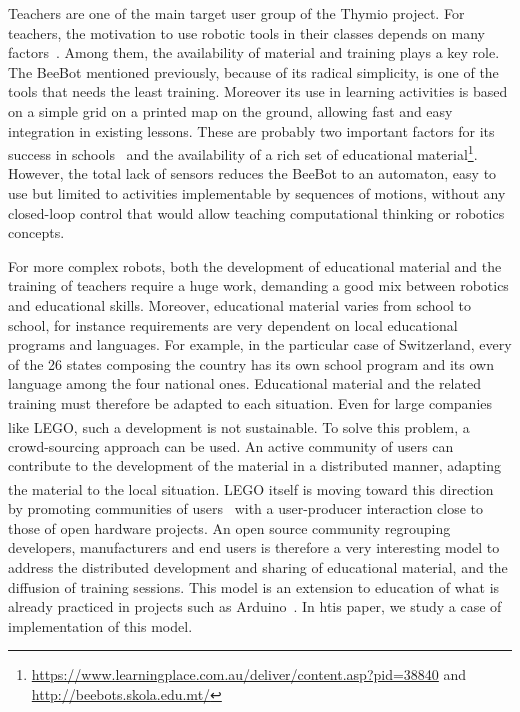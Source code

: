 \documentclass[letterpaper, 10 pt, conference]{ieeeconf}  %
\begin{document}
Teachers are one of the main target user group of the Thymio project.
For teachers, the motivation to use robotic tools in their classes depends on many factors~\cite{chevalier2016}.
Among them, the availability of material and training plays a key role.
The BeeBot mentioned previously, because of its radical simplicity, is one of the tools that needs the least training. 
Moreover its use in learning activities is based on a simple grid on a printed map on the ground, allowing fast and easy integration in existing lessons.
These are probably two important factors for its success in schools~\cite{2008highfield,2008demichele} and the availability of a rich set of educational material\footnote{\url{https://www.learningplace.com.au/deliver/content.asp?pid=38840} and \\ \url{http://beebots.skola.edu.mt/}}.
However, the total lack of sensors reduces the BeeBot to an automaton, easy to use but limited to activities implementable by sequences of motions, without any closed-loop control that would allow teaching computational thinking or robotics concepts.

For more complex robots, both the development of educational material and the training of teachers require a huge work, demanding a good mix between robotics and educational skills. 
Moreover, educational material varies from school to school, for instance requirements are very dependent on local educational programs and languages. 
For example, in the particular case of Switzerland, every of the 26 states composing the country has its own school program and its own language among the four national ones. 
Educational material and the related training must therefore be adapted to each situation.
Even for large companies like LEGO\textsuperscript{\textregistered}, such a development is not sustainable. 
To solve this problem, a crowd-sourcing approach can be used.
An active community of users can contribute to the development of the material in a distributed manner, adapting the material to the local situation.
LEGO\textsuperscript{\textregistered} itself is moving toward this direction by promoting communities of users~\cite{Hienerth2014} with a user-producer interaction close to those of open hardware projects.
An open source community regrouping developers, manufacturers and end users is therefore a very interesting model to address the distributed development and sharing of educational material, and the diffusion of training sessions.
This model is an extension to education of what is already practiced in projects such as Arduino~\cite{Jamieson2010}.
In htis paper, we study a case of implementation of this model.
\end{document}

